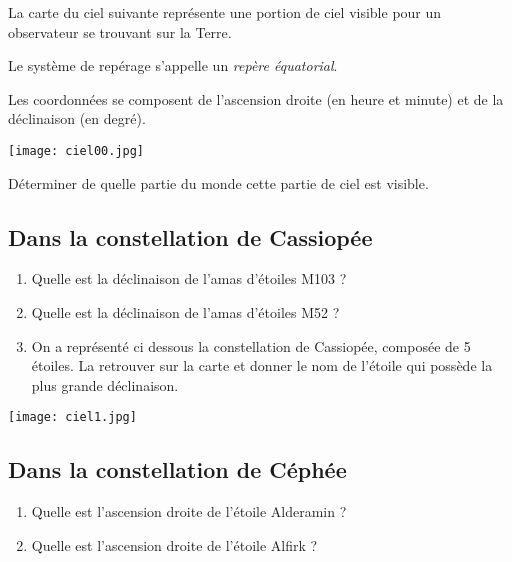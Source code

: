 
La carte du ciel suivante représente une portion de ciel visible pour un observateur se trouvant sur la Terre.

Le système de repérage s'appelle un \textit{repère équatorial}.

Les coordonnées se composent de l'ascension droite (en heure et minute) et de la déclinaison (en degré).

\begin{center}
\texttt{[image: ciel00.jpg]} 
\end{center}


Déterminer de quelle partie du monde cette partie de ciel est visible.


\begin{minipage}{0.48\linewidth}

\subsection*{Dans la constellation de Cassiopée}

\begin{enumerate}
\item Quelle est la déclinaison de l'amas d'étoiles M103 ?
\item Quelle est la déclinaison de l'amas d'étoiles M52 ?
\item On a représenté ci dessous la constellation de Cassiopée, composée de 5 étoiles. La retrouver sur la carte et donner le nom de l'étoile qui possède la plus grande déclinaison.
\end{enumerate}
\end{minipage}
 \hfill
\begin{minipage}{0.48\linewidth}
\begin{center}
\texttt{[image: ciel1.jpg]} 
\end{center}
\end{minipage}



\subsection*{Dans la constellation de Céphée}

\begin{enumerate}
\item Quelle est l'ascension droite de l'étoile Alderamin ?
\item Quelle est l'ascension droite de l'étoile Alfirk ?
\end{enumerate}





